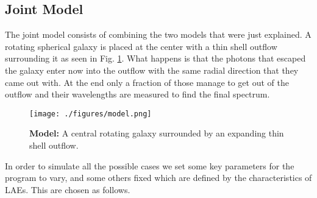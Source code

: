 \documentclass{latex/emulateapj}
\begin{document}


\subsection{Joint Model}

The joint model consists of combining the two models that were just
explained. A rotating spherical galaxy is placed at the center with a
thin shell outflow surrounding it as seen in
Fig. \ref{fig:model}. What happens is that the photons that escaped
the galaxy enter now into the outflow with the same radial direction
that they came out with. At the end only a fraction of those manage to
get out of the outflow and their wavelengths are measured to find the
final spectrum. 

\begin{figure}[h!]
\begin{center}
  \texttt{[image: ./figures/model.png]}
\end{center}
\caption{\textbf{Model:} A central rotating galaxy surrounded by an expanding thin shell outflow.
\label{fig:model}}
\end{figure}

In order to simulate all the possible cases we set some key parameters
for the program to vary, and some others fixed which are defined by
the characteristics of LAEs. This are chosen as follows.
\end{document}

